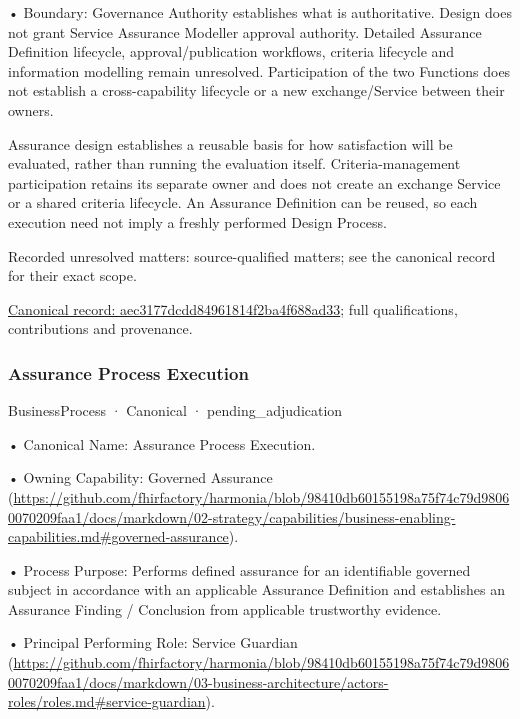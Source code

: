 •
Boundary: Governance Authority establishes what is authoritative. Design does not grant Service Assurance Modeller approval authority. Detailed Assurance Definition lifecycle, approval/publication workflows, criteria lifecycle and information modelling remain unresolved. Participation of the two Functions does not establish a cross-capability lifecycle or a new exchange/Service between their owners.



Assurance design establishes a reusable basis for how satisfaction will be evaluated, rather than running the evaluation itself. Criteria-management participation retains its separate owner and does not create an exchange Service or a shared criteria lifecycle. An Assurance Definition can be reused, so each execution need not imply a freshly performed Design Process.


{\small Recorded unresolved matters: source-qualified matters; see the canonical record for their exact scope.}\par
{\footnotesize \href{../../../../continuum/business/business-process/aec3177dcdd84961814f2ba4f688ad33.md}{Canonical record: aec3177dcdd84961814f2ba4f688ad33}; full qualifications, contributions and provenance.}\par
\subsubsection{Assurance Process Execution}

\label{element:3c67e57403b041bb8ccdaf3980b6ff94}
{\small BusinessProcess · Canonical · pending\_adjudication}\par

•
Canonical Name: Assurance Process Execution.



•
Owning Capability: Governed Assurance (\url{https://github.com/fhirfactory/harmonia/blob/98410db60155198a75f74c79d98060070209faa1/docs/markdown/02-strategy/capabilities/business-enabling-capabilities.md#governed-assurance}).



•
Process Purpose: Performs defined assurance for an identifiable governed subject in accordance with an applicable Assurance Definition and establishes an Assurance Finding / Conclusion from applicable trustworthy evidence.



•
Principal Performing Role: Service Guardian (\url{https://github.com/fhirfactory/harmonia/blob/98410db60155198a75f74c79d98060070209faa1/docs/markdown/03-business-architecture/actors-roles/roles.md#service-guardian}).



